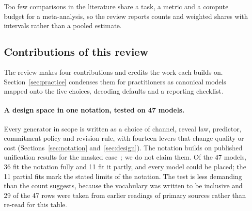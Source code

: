 Too few comparisons in the literature share a task, a metric and a compute budget for a meta-analysis, so the review reports counts and weighted shares with intervals rather than a pooled estimate.

\subsection{Contributions of this review}
\label{sec:intro-contrib}

The review makes four contributions and credits the work each builds on. Section~\ref{sec:practice} condenses them for practitioners as canonical models mapped onto the five choices, decoding defaults and a reporting checklist.

\paragraph{A design space in one notation, tested on 47 models.}
Every generator in scope is written as a choice of channel, reveal law, predictor, commitment policy and revision rule, with fourteen levers that change quality or cost (Sections~\ref{sec:notation} and~\ref{sec:design}). The notation builds on published unification results for the masked case~\cite{arXiv:2406.07524,arXiv:2406.04329,arXiv:2406.03736}; we do not claim them. Of the 47 models, 36 fit the notation fully and 11 fit it partly, and every model could be placed; the 11 partial fits mark the stated limits of the notation. %
The test is less demanding than the count suggests, because the vocabulary was written to be inclusive and 29 of the 47 rows were taken from earlier readings of primary sources rather than re-read for this table. %

